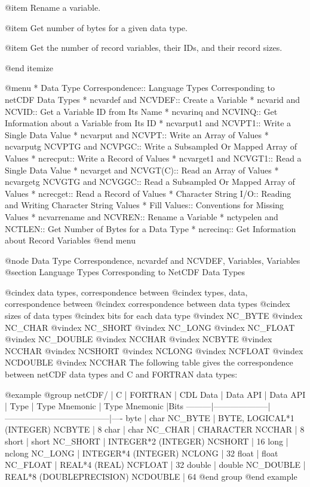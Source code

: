 @item
Rename a variable.

@item
Get number of bytes for a given data type.

@item
Get the number of record variables, their IDs, and their record sizes.

@end itemize

@menu
* Data Type Correspondence:: Language Types Corresponding to netCDF Data Types
* ncvardef and NCVDEF::     Create a Variable
* ncvarid and NCVID::       Get a Variable ID from Its Name
* ncvarinq and NCVINQ::     Get Information about a Variable from Its ID
* ncvarput1 and NCVPT1::    Write a Single Data Value
* ncvarput and NCVPT::      Write an Array of Values
* ncvarputg NCVPTG and NCVPGC::    Write a Subsampled Or Mapped Array of Values
* ncrecput::                Write a Record of Values
* ncvarget1 and NCVGT1::    Read a Single Data Value
* ncvarget and NCVGT(C)::   Read an Array of Values
* ncvargetg NCVGTG and NCVGGC::    Read a Subsampled Or Mapped Array of Values
* ncrecget::                Read a Record of Values
* Character String I/O::    Reading and Writing Character String Values
* Fill Values::             Conventions for Missing Values
* ncvarrename and NCVREN::  Rename a Variable
* nctypelen and NCTLEN::    Get Number of Bytes for a Data Type
* ncrecinq::                Get Information about Record Variables
@end menu

@node Data Type Correspondence, ncvardef and NCVDEF, Variables, Variables
@section Language Types Corresponding to NetCDF Data Types

@cindex data types, correspondence between
@cindex types, data, correspondence between
@cindex correspondence between data types
@cindex sizes of data types
@cindex bits for each data type
@vindex NC_BYTE
@vindex NC_CHAR
@vindex NC_SHORT
@vindex NC_LONG
@vindex NC_FLOAT
@vindex NC_DOUBLE
@vindex NCCHAR
@vindex NCBYTE
@vindex NCCHAR
@vindex NCSHORT
@vindex NCLONG
@vindex NCFLOAT
@vindex NCDOUBLE
@vindex NCCHAR
The following table gives the correspondence between netCDF data types
and C and FORTRAN data types:

@example
@group
netCDF/  |        C           |                FORTRAN               |
CDL Data |  Data      API     |         Data                  API    |
 Type    |  Type    Mnemonic  |         Type                Mnemonic |Bits
---------|--------------------|--------------------------------------|----
byte     | char     NC_BYTE   | BYTE, LOGICAL*1 (INTEGER)   NCBYTE   |  8
char     | char     NC_CHAR   | CHARACTER                   NCCHAR   |  8
short    | short    NC_SHORT  | INTEGER*2 (INTEGER)         NCSHORT  | 16
long     | nclong   NC_LONG   | INTEGER*4 (INTEGER)         NCLONG   | 32
float    | float    NC_FLOAT  | REAL*4 (REAL)               NCFLOAT  | 32
double   | double   NC_DOUBLE | REAL*8 (DOUBLEPRECISION)    NCDOUBLE | 64
@end group
@end example

